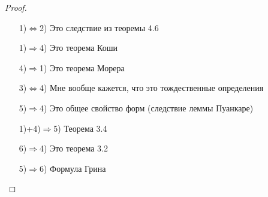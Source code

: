 \begin{proof}\thmslashn
	\begin{enumerate}
		\item[1)$\Leftrightarrow$2)]
		Это следствие из теоремы 4.6
		\item[1)$\Rightarrow$4)]
		Это теорема Коши
		\item[4)$\Rightarrow$1)]
		Это теорема Морера
		\item[3)$\Leftrightarrow$4)]
		Мне вообще кажется, что это тождественные определения
		\item[5)$\Rightarrow$4)]
		Это общее свойство форм (следствие леммы Пуанкаре)
		\item[1)+4)$\Rightarrow$5)]
		Теорема 3.4
		\item[6)$\Rightarrow$4)]
		Это теорема 3.2
		\item[5)$\Rightarrow$6)]
		Формула Грина
		
	\end{enumerate}
	
\end{proof}